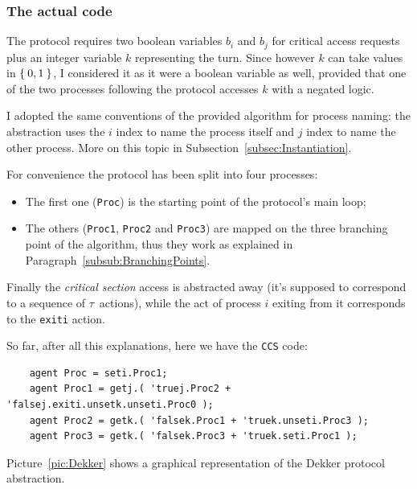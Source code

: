 \documentclass[10pt,a4paper]{article}
\newcommand{\CCS}{{\tt CCS}}
\newcommand{\CCSCode}[1]{{\tt #1}}
\newcommand{\Agent}[1]{{\tt {#1}}}
\begin{document}
        \subsubsection{The actual code}
        \label{subsub:ActualCode}

            The protocol requires two boolean variables $b_i$ and $b_j$
            for critical access requests plus an integer variable $k$
            representing the turn. Since however $k$ can take values in
            $\Set{0, 1}$, I considered it as it were a boolean variable as
            well, provided that one of the two processes following the
            protocol accesses $k$ with a negated logic.

            I adopted the same conventions of the provided algorithm for
            process naming: the abstraction uses the $i$ index to name the
            process itself and $j$ index to name the other process. More
            on this topic in Subsection~\ref{subsec:Instantiation}.

            For convenience the protocol has been split into four
            processes:
            \begin{itemize}
            \item   The first one (\Agent{Proc}) is the starting point of
                    the protocol's main loop;
            \item   The others (\Agent{Proc1}, \Agent{Proc2} and
                    \Agent{Proc3}) are mapped on the three branching point
                    of the algorithm, thus they work as explained in
                    Paragraph~\ref{subsub:BranchingPoints}.
            \end{itemize}

            Finally the \emph{critical section} access is abstracted away
            (it's supposed to correspond to a sequence of $\tau$~actions),
            while the act of process $i$ exiting from it corresponds to
            the \CCSCode{exiti} action.

            So far, after all this explanations, here we have the \CCS{}
            code:
            \begin{verbatim}
    agent Proc = seti.Proc1;
    agent Proc1 = getj.( 'truej.Proc2 + 'falsej.exiti.unsetk.unseti.Proc0 );
    agent Proc2 = getk.( 'falsek.Proc1 + 'truek.unseti.Proc3 );
    agent Proc3 = getk.( 'falsek.Proc3 + 'truek.seti.Proc1 );
            \end{verbatim}

            Picture~\ref{pic:Dekker} shows a graphical representation of the
            Dekker protocol abstraction.
\end{document}
